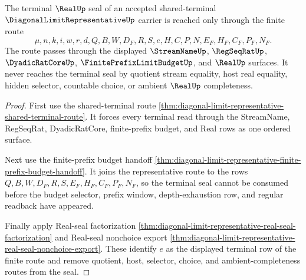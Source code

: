 \begin{theorem}
\label{thm:diagonal-limit-representative-terminal-seal-root-unblock}
The terminal $\RealUp$ seal of an accepted shared-terminal $\DiagonalLimitRepresentativeUp$ carrier is reached only through the finite route
$$
\mu,n,k,i,w,r,d,Q,B,W,D_F,R,S,e,H,C,P,N,E_F,H_F,C_F,P_F,N_F.
$$
The route passes through the displayed $\StreamNameUp$, $\RegSeqRatUp$, $\DyadicRatCoreUp$, $\FinitePrefixLimitBudgetUp$, and $\RealUp$ surfaces. It never reaches the terminal seal by quotient stream equality, host real equality, hidden selector, countable choice, or ambient $\RealUp$ completeness.
\end{theorem}
\begin{proof}
First use the shared-terminal route \autoref{thm:diagonal-limit-representative-shared-terminal-route}. It forces every terminal read through the StreamName, RegSeqRat, DyadicRatCore, finite-prefix budget, and Real rows as one ordered surface.

Next use the finite-prefix budget handoff \autoref{thm:diagonal-limit-representative-finite-prefix-budget-handoff}. It joins the representative route to the rows $Q,B,W,D_F,R,S,E_F,H_F,C_F,P_F,N_F$, so the terminal seal cannot be consumed before the budget selector, prefix window, depth-exhaustion row, and regular readback have appeared.

Finally apply Real-seal factorization \autoref{thm:diagonal-limit-representative-real-seal-factorization} and Real-seal nonchoice export \autoref{thm:diagonal-limit-representative-real-seal-nonchoice-export}. These identify $e$ as the displayed terminal row of the finite route and remove quotient, host, selector, choice, and ambient-completeness routes from the seal.
\end{proof}

